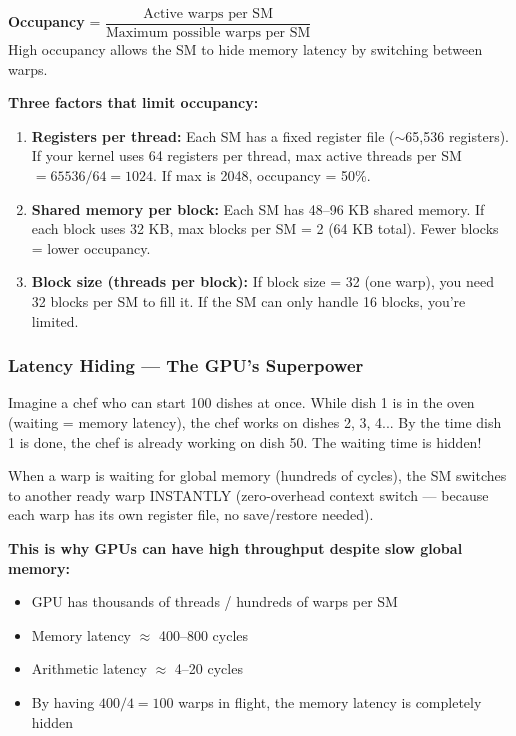 \documentclass[11pt,a4paper]{article}
\newcommand{\term}[1]{\textbf{\color{darkblue}#1}}
\begin{document}
\begin{mydef}
\textbf{Occupancy} = \(\dfrac{\text{Active warps per SM}}{\text{Maximum possible warps per SM}}\)\\[4pt]
High occupancy allows the SM to hide memory latency by switching between warps.
\end{mydef}

\textbf{Three factors that limit occupancy:}

\begin{enumerate}[noitemsep]
  \item \term{Registers per thread:} Each SM has a fixed register file ($\sim$65,536 registers). If your kernel uses 64 registers per thread, max active threads per SM $= 65536/64 = 1024$. If max is 2048, occupancy = 50\%.
  \item \term{Shared memory per block:} Each SM has 48--96 KB shared memory. If each block uses 32 KB, max blocks per SM = 2 (64 KB total). Fewer blocks = lower occupancy.
  \item \term{Block size (threads per block):} If block size = 32 (one warp), you need 32 blocks per SM to fill it. If the SM can only handle 16 blocks, you're limited.
\end{enumerate}

\subsubsection{Latency Hiding --- The GPU's Superpower}

\begin{analogy}
Imagine a chef who can start 100 dishes at once. While dish 1 is in the oven (waiting = memory latency), the chef works on dishes 2, 3, 4... By the time dish 1 is done, the chef is already working on dish 50. The waiting time is hidden!
\end{analogy}

When a warp is waiting for global memory (hundreds of cycles), the SM switches to another ready warp INSTANTLY (zero-overhead context switch --- because each warp has its own register file, no save/restore needed).

\textbf{This is why GPUs can have high throughput despite slow global memory:}
\begin{itemize}[noitemsep]
  \item GPU has thousands of threads / hundreds of warps per SM
  \item Memory latency $\approx$ 400--800 cycles
  \item Arithmetic latency $\approx$ 4--20 cycles
  \item By having $400/4 = 100$ warps in flight, the memory latency is completely hidden
\end{itemize}
\end{document}
